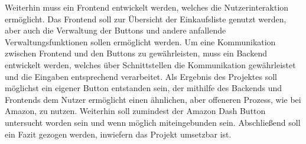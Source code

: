 Weiterhin muss ein Frontend entwickelt werden, welches die Nutzerinteraktion ermöglicht. Das Frontend soll zur Übersicht der Einkaufsliste genutzt werden, aber auch die Verwaltung der Buttons und andere anfallende Verwaltungsfunktionen sollen ermöglicht werden. 
Um eine Kommunikation zwischen Frontend und den Buttons zu gewährleisten, muss ein Backend entwickelt werden, welches über Schnittstellen die Kommunikation gewährleistet und die Eingaben entsprechend verarbeitet. 
Als Ergebnis des Projektes soll möglichst ein eigener Button entstanden sein, der mithilfe des Backends und Frontends dem Nutzer ermöglicht einen ähnlichen, aber offeneren Prozess, wie bei Amazon, zu nutzen. Weiterhin soll zumindest der Amazon Dash Button untersucht worden sein und wenn möglich miteingebunden sein. Abschließend soll ein Fazit gezogen werden, inwiefern das Projekt umsetzbar ist. 
